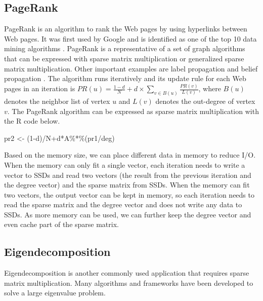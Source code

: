 \subsection{PageRank}
PageRank is an algorithm to rank the Web pages by using hyperlinks between Web
pages. It was first used by Google and is identified as one of the top 10 data
mining algorithms \cite{top10}. PageRank is a representative of a set of graph
algorithms that can be expressed with sparse matrix multiplication or generalized
sparse matrix multiplication. Other important examples are label propagation \cite{}
and belief propagation \cite{}. The algorithm runs iteratively and its update
rule for each Web pages in an iteration is
$PR(u) = \frac{1-d}{N} + d \times \sum\limits_{v \in B(u)} \frac{PR(v)}{L(v)}$,
where $B(u)$ denotes the neighbor list of vertex $u$ and $L(v)$ denotes
the out-degree of vertex $v$. The PageRank algorithm can be expressed as sparse
matrix multiplication with the R code below.

pr2 <- (1-d)/N+d*A\%*\%(pr1/deg)

Based on the memory size, we can place different data in memory to reduce I/O.
When the memory can only fit a single vector, each iteration needs
to write a vector to SSDs and read two vectors (the result from
the previous iteration and the degree vector) and the sparse matrix
from SSDs. When the memory can fit two vectors, the output vector can be kept
in memory, so each iteration needs to read the sparse matrix and the degree vector
and does not write any data to SSDs. As more memory can be used, we can
further keep the degree vector and even cache part of the sparse matrix.

\subsection{Eigendecomposition}
Eigendecomposition is another commonly
used application that requires sparse matrix multiplication. Many
algorithms \cite{Lanczos, IRLM, krylovschur} and frameworks
\cite{arpack, anasazi, slepc} have been developed to solve a large eigenvalue
problem.

